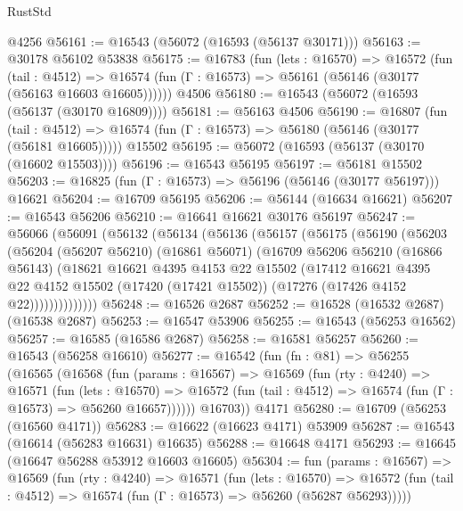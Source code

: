\begin{lexlean}{RustStd}
\begin{coremodule}
    @4256
@56161 := @16543 (@56072 (@16593 (@56137 @30171)))
@56163 := @30178 @56102 @53838
@56175 := @16783
    (fun (lets : @16570) =>
    @16572
      (fun (tail : @4512) =>
      @16574 (fun (Γ : @16573) => @56161 (@56146 (@30177 (@56163 @16603 @16605))))))
    @4506
@56180 := @16543 (@56072 (@16593 (@56137 (@30170 @16809))))
@56181 := @56163 @4506
@56190 := @16807
    (fun (tail : @4512) => @16574 (fun (Γ : @16573) => @56180 (@56146 (@30177 (@56181 @16605)))))
    @15502
@56195 := @56072 (@16593 (@56137 (@30170 (@16602 @15503))))
@56196 := @16543 @56195
@56197 := @56181 @15502
@56203 := @16825 (fun (Γ : @16573) => @56196 (@56146 (@30177 @56197))) @16621
@56204 := @16709 @56195
@56206 := @56144 (@16634 @16621)
@56207 := @16543 @56206
@56210 := @16641 @16621 @30176 @56197
@56247 := @56066
    (@56091
      (@56132
        (@56134
          (@56136
            (@56157
              (@56175
                (@56190
                  (@56203
                    (@56204
                      (@56207 @56210)
                      (@16861 @56071)
                      (@16709
                        @56206
                        @56210
                        (@16866 @56143)
                        (@18621
                          @16621
                          @4395
                          @4153
                          @22
                          @15502
                          (@17412
                            @16621
                            @4395
                            @22
                            @4152
                            @15502
                            (@17420 (@17421 @15502))
                            (@17276 (@17426 @4152 @22))))))))))))))
@56248 := @16526 @2687
@56252 := @16528 (@16532 @2687) (@16538 @2687)
@56253 := @16547 @53906
@56255 := @16543 (@56253 @16562)
@56257 := @16585 (@16586 @2687)
@56258 := @16581 @56257
@56260 := @16543 (@56258 @16610)
@56277 := @16542
    (fun (fn : @81) =>
    @56255
      (@16565
        (@16568
          (fun (params : @16567) =>
          @16569
            (fun (rty : @4240) =>
            @16571
              (fun (lets : @16570) =>
              @16572 (fun (tail : @4512) => @16574 (fun (Γ : @16573) => @56260 @16657))))))
        @16703))
    @4171
@56280 := @16709 (@56253 (@16560 @4171))
@56283 := @16622 (@16623 @4171) @53909
@56287 := @16543 (@16614 (@56283 @16631) @16635)
@56288 := @16648 @4171
@56293 := @16645 (@16647 @56288 @53912 @16603 @16605)
@56304 := fun (params : @16567) =>
  @16569
    (fun (rty : @4240) =>
    @16571
      (fun (lets : @16570) =>
      @16572 (fun (tail : @4512) => @16574 (fun (Γ : @16573) => @56260 (@56287 @56293)))))

\end{coremodule}
\end{lexlean}
